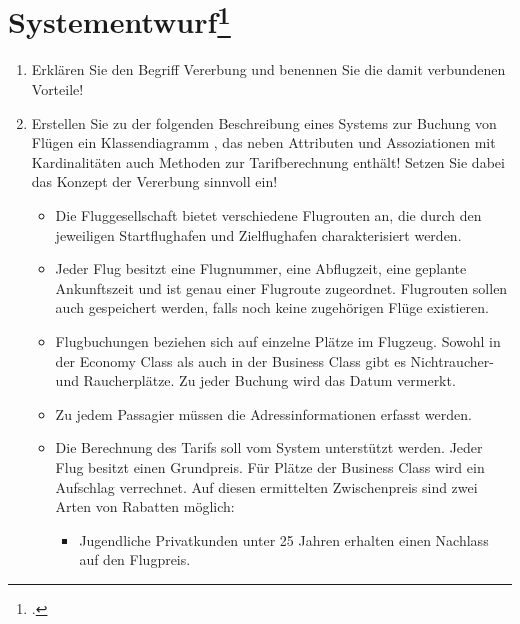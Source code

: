\documentclass{lehramt-informatik-aufgabe}
\begin{document}

\section{Systementwurf\footcite[Thema 1 Aufgabe 5]{examen:66112:2006:09}}

\begin{enumerate}


\item Erklären Sie den Begriff Vererbung  und benennen
Sie die damit verbundenen Vorteile!


\item Erstellen Sie zu der folgenden Beschreibung eines Systems zur
Buchung von Flügen ein Klassendiagramm
, das neben Attributen und
Assoziationen mit Kardinalitäten auch Methoden zur Tarifberechnung
enthält! Setzen Sie dabei das Konzept der Vererbung sinnvoll ein!

\begin{itemize}
\item Die Fluggesellschaft bietet verschiedene Flugrouten an, die durch
den jeweiligen Startflughafen und Zielflughafen charakterisiert werden.

\item Jeder Flug besitzt eine Flugnummer, eine Abflugzeit, eine geplante
Ankunftszeit und ist genau einer Flugroute zugeordnet. Flugrouten sollen
auch gespeichert werden, falls noch keine zugehörigen Flüge existieren.

\item Flugbuchungen beziehen sich auf einzelne Plätze im Flugzeug.
Sowohl in der Economy Class als auch in der Business Class gibt es
Nichtraucher- und Raucherplätze. Zu jeder Buchung wird das Datum
vermerkt.

\item Zu jedem Passagier müssen die Adressinformationen erfasst werden.

\item Die Berechnung des Tarifs soll vom System unterstützt werden.
Jeder Flug besitzt einen Grundpreis. Für Plätze der Business Class wird
ein Aufschlag verrechnet. Auf diesen ermittelten Zwischenpreis sind zwei
Arten von Rabatten möglich:

\begin{itemize}
\item Jugendliche Privatkunden unter 25 Jahren erhalten einen Nachlass
auf den Flugpreis.


\end{itemize}
\end{itemize}
\end{enumerate}
\end{document}
